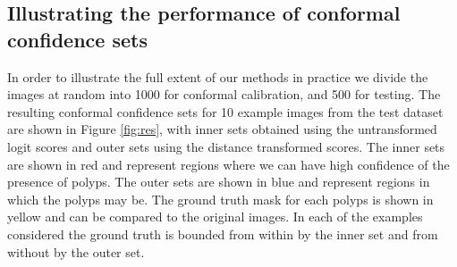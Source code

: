 \subsection{Illustrating the performance of conformal confidence sets}\label{SS:val}
In order to illustrate the full extent of our methods in practice we divide the  images at random into 1000 for conformal calibration, and 500 for testing. The resulting conformal confidence sets for 10 example images from the test dataset are shown in Figure \ref{fig:res}, with inner sets obtained using the untransformed logit scores and outer sets using the distance transformed scores. The inner sets are shown in red and represent regions where we can have high confidence of the presence of polyps. The outer sets are shown in blue and represent regions in which the polyps may be. The ground truth mask for each polyps is shown in yellow and can be compared to the original images. In each of the examples considered the ground truth is bounded from within by the inner set and from without by the outer set. 
